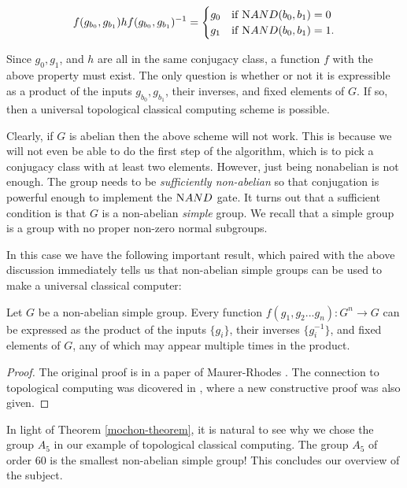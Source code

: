 $$
f(g_{b_0},g_{b_1})hf(g_{b_0},g_{b_1})^{-1}=
\begin{cases}
g_0 & \text{if   }{\textsc NAND}(b_0,b_1)=0\\
g_1 & \text{if }{\textsc NAND}(b_0,b_1)=1.
\end{cases}
$$

Since $g_0,g_1$, and $h$ are all in the same conjugacy class, a function $f$ with the above property must exist. The only question is whether or not it is expressible as a product of the inputs $g_{b_0}, g_{b_1}$, their inverses, and fixed elements of $G$. If so, then a universal topological classical computing scheme is possible.


Clearly, if $G$ is abelian then the above scheme will not work. This is because we will not even be able to do the first step of the algorithm, which is to pick a conjugacy class with at least two elements. However, just being nonabelian is not enough. The group needs to be {\em sufficiently non-abelian} so that conjugation is powerful enough to implement the ${\textsc NAND}$ gate. It turns out that a sufficient condition is that $G$ is a non-abelian {\em simple} group. We recall that a simple group is a group with no proper non-zero normal subgroups.

In this case we have the following important result, which paired with the above discussion immediately tells us that non-abelian simple groups can be used to make a universal classical computer:

\begin{thrm}\label{mochon-theorem} Let $G$ be a non-abelian simple group. Every function $f(g_1,g_2...g_n):G^n\to G$ can be expressed as the product of the inputs $\{g_i\}$, their inverses $\{g_i^{-1}\}$, and fixed elements of $G$, any of which may appear multiple times in the product.
\end{thrm}
\begin{proof} The original proof is in a paper of Maurer-Rhodes \cite{maurer1965property}. The connection to topological computing was dicovered in \cite{mochon2003anyons}, where a new constructive proof was also given.
\end{proof}

\begin{rem}
In light of Theorem \ref{mochon-theorem}, it is natural to see why we chose the group $A_5$ in our example of topological classical computing. The group $A_5$ of order $60$ is the smallest non-abelian simple group! This concludes our overview of the subject.
\end{rem}

